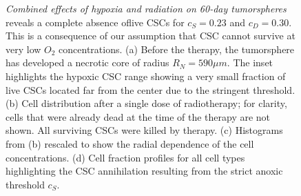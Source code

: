 \documentclass[10pt,letterpaper]{article}
\begin{document}
\begin{figure}[ht]
	\centering
	\caption{\emph{Combined effects of hypoxia and radiation on 60-day tumorspheres} reveals a complete absence oflive CSCs for $c_S=0.23$ and $c_D=0.30$. This is a consequence of our assumption that CSC cannot survive at very low $O_2$ concentrations. (a) Before the therapy, the tumorsphere has developed a necrotic core of radius $ R_N = 590 \mu m$. The inset highlights the hypoxic CSC range showing a very small fraction of live CSCs located far from the center due to the stringent threshold.  (b) Cell distribution after a single dose of radiotherapy; for clarity, cells that were already dead at the time of the therapy are not shown. All surviving CSCs were killed by therapy. (c) Histograms from (b) rescaled to show the radial dependence of the cell concentrations. (d) Cell fraction profiles for all cell types highlighting the CSC annihilation resulting from  the strict anoxic threshold $c_S$.}
	\label{fig:S3}
\end{figure}

\nolinenumbers

\end{document}

